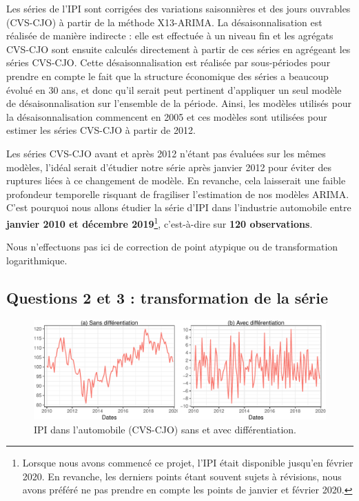 \documentclass[french]{article}
\begin{document}
Les séries de l'IPI sont corrigées des variations saisonnières et des jours ouvrables (CVS-CJO) à partir de la méthode X13-ARIMA.
La désaisonnalisation est réalisée de manière indirecte : elle est effectuée à un niveau fin et les agrégats CVS-CJO sont ensuite calculés directement à partir de ces séries en agrégeant les séries CVS-CJO.
Cette désaisonnalisation est réalisée par sous-périodes pour prendre en compte le fait que la structure économique des séries a beaucoup évolué en 30 ans, et donc qu'il serait peut pertinent d'appliquer un seul modèle de désaisonnalisation sur l'ensemble de la période.
Ainsi, les modèles utilisés pour la désaisonnalisation commencent en 2005 et ces modèles sont utilisées pour estimer les séries CVS-CJO à partir de 2012.

Les séries CVS-CJO avant et après 2012 n'étant pas évaluées sur les mêmes modèles, l'idéal serait d'étudier notre série après janvier 2012 pour éviter des ruptures liées à ce changement de modèle. En revanche, cela laisserait une faible profondeur temporelle risquant de fragiliser l'estimation de nos modèles ARIMA.
C'est pourquoi nous allons étudier la série d'IPI dans l'industrie automobile entre \textbf{janvier 2010 et décembre 2019}\footnote{Lorsque nous avons commencé ce projet, l'IPI était disponible jusqu'en février 2020.
  En revanche, les derniers points étant souvent sujets à révisions, nous avons préféré ne pas prendre en compte les points de janvier et février 2020.}, c'est-à-dire sur \textbf{120 observations}.

Nous n'effectuons pas ici de correction de point atypique ou de transformation logarithmique.

\hypertarget{questions-2-et-3-transformation-de-la-suxe9rie}{%
\subsection{Questions 2 et 3 : transformation de la série}\label{questions-2-et-3-transformation-de-la-suxe9rie}}

\begin{figure}

{\centering \includegraphics{img/rmd-compGraph-1} 

}

\caption{IPI dans l'automobile (CVS-CJO) sans et avec différentiation.}\label{fig:compGraph}
\end{figure}
\end{document}
